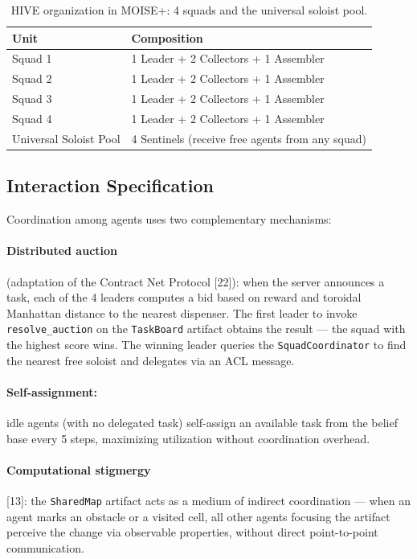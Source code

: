 \documentclass[11pt,a4paper]{article}
\newcommand{\code}[1]{\texttt{#1}}
\begin{document}
\begin{table}[H]
\centering
\begin{tabularx}{\linewidth}{l X}
\toprule
\textbf{Unit} & \textbf{Composition} \\
\midrule
Squad 1 & 1 Leader + 2 Collectors + 1 Assembler \\
Squad 2 & 1 Leader + 2 Collectors + 1 Assembler \\
Squad 3 & 1 Leader + 2 Collectors + 1 Assembler \\
Squad 4 & 1 Leader + 2 Collectors + 1 Assembler \\
\midrule
Universal Soloist Pool & 4 Sentinels (receive free agents from any squad) \\
\bottomrule
\end{tabularx}
\caption{HIVE organization in MOISE+: 4 squads and the universal soloist pool.}
\end{table}

\subsection{Interaction Specification}
Coordination among agents uses two complementary mechanisms:

\paragraph{Distributed auction} (adaptation of the Contract Net Protocol [22]): when the server announces a task, each of the 4 leaders computes a bid based on reward and toroidal Manhattan distance to the nearest dispenser. The first leader to invoke \code{resolve\_auction} on the \code{TaskBoard} artifact obtains the result --- the squad with the highest score wins. The winning leader queries the \code{SquadCoordinator} to find the nearest free soloist and delegates via an ACL message.

\paragraph{Self-assignment:} idle agents (with no delegated task) self-assign an available task from the belief base every 5 steps, maximizing utilization without coordination overhead.

\paragraph{Computational stigmergy} [13]: the \code{SharedMap} artifact acts as a medium of indirect coordination --- when an agent marks an obstacle or a visited cell, all other agents focusing the artifact perceive the change via observable properties, without direct point-to-point communication.
\end{document}
